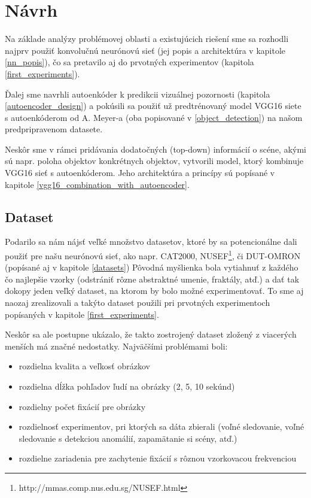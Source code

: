
\newpage
\section{Návrh}
\label{design}

Na základe analýzy problémovej oblasti a existujúcich riešení sme sa rozhodli najprv použiť konvolučnú neurónovú sieť (jej popis a architektúra v kapitole \ref{nn_popis}), čo sa pretavilo aj do prvotných experimentov (kapitola \ref{first_experiments}).

Ďalej sme navrhli autoenkóder k predikcii vizuálnej pozornosti (kapitola \ref{autoencoder_design}) a pokúsili sa použiť už predtrénovaný model VGG16 siete s autoenkóderom od A. Meyer-a (oba popisované v \ref{object_detection}) na našom predpripravenom datasete. 

Neskôr sme v rámci pridávania dodatočných (top-down) informácií o scéne, akými sú napr. poloha objektov konkrétnych objektov, vytvorili model, ktorý kombinuje VGG16 sieť s autoenkóderom. Jeho architektúra a princípy sú popísané v kapitole \ref{vgg16_combination_with_autoencoder}.

\subsection{Dataset}
\label{dataset_description}
Podarilo sa nám nájsť veľké množstvo datasetov, ktoré by sa potencionálne dali použiť pre našu neurónovú sieť, ako napr. 
CAT2000\cite{borji2015cat2000}, NUSEF\footnote{http://mmas.comp.nus.edu.sg/NUSEF.html}, či DUT-OMRON\cite{dut-omron} (popísané aj v kapitole \ref{datasets}) Pôvodná myšlienka bola vytiahnuť z každého čo najlepšie vzorky (odstrániť rôzne abstraktné umenie, fraktály, atď.) a dať tak dokopy jeden veľký dataset, na ktorom by bolo možné experimentovať. To sme aj naozaj zrealizovali a takýto dataset použili pri prvotných experimentoch popísaných v kapitole \ref{first_experiments}.

Neskôr sa ale postupne ukázalo, že takto zostrojený dataset zložený z viacerých menších má značné nedostatky. Najväčšími problémami boli:
\begin{itemize}
	\item rozdielna kvalita a veľkosť obrázkov
	\item rozdielna dĺžka pohľadov ľudí na obrázky (2, 5, 10 sekúnd)
	\item rozdielny počet fixácií pre obrázky
	\item rozdielnosť experimentov, pri ktorých sa dáta zbierali (voľné sledovanie, voľné sledovanie s detekciou anomálií, zapamätanie si scény, atď.)
	\item rozdielne zariadenia pre zachytenie fixácií s rôznou vzorkovacou frekvenciou 
\end{itemize}

